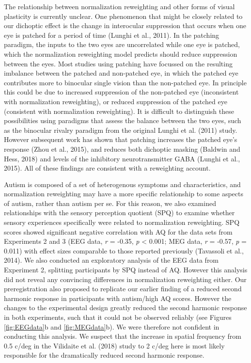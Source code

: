 \documentclass[
]{article}
\begin{document}
The relationship between normalization reweighting and other forms of visual plasticity is currently unclear. One phenomenon that might be closely related to our dichoptic effect is the change in interocular suppression that occurs when one eye is patched for a period of time (Lunghi et al., 2011). In the patching paradigm, the inputs to the two eyes are uncorrelated while one eye is patched, which the normalization reweighting model predicts should reduce suppression between the eyes. Most studies using patching have focussed on the resulting imbalance between the patched and non-patched eye, in which the patched eye contributes more to binocular single vision than the non-patched eye. In principle this could be due to increased suppression of the non-patched eye (inconsistent with normalization reweighting), or reduced suppression of the patched eye (consistent with normalization reweighting). It is difficult to distinguish these possibilities using paradigms that assess the balance between the two eyes, such as the binocular rivalry paradigm from the original Lunghi et al. (2011) study. However subsequent work has shown that patching increases the patched eye's response (Zhou et al., 2015), and reduces both dichoptic masking (Baldwin and Hess, 2018) and levels of the inhibitory neurotransmitter GABA (Lunghi et al., 2015). All of these findings are consistent with a reweighting account.

Autism is composed of a set of heterogenous symptoms and characteristics, and normalization reweighting may have a more specific relationship to some aspects of autism, rather than autism per se. For this reason, we also examined relationships with the sensory perception quotient (SPQ) to examine whether sensory experiences specifically were related to normalization reweighting. SPQ scores showed significant negative correlation with AQ for the data sets from Experiments 2 and 3 (EEG data, \emph{r} = -0.35, \emph{p} \textless{} 0.001; MEG data, \emph{r} = -0.57, \emph{p} = 0.011) with effect sizes comparable to those reported previously (Tavassoli et al., 2014). We also conducted an exploratory analysis of the EEG data from Experiment 2, splitting participants by SPQ instead of AQ. However this analysis did not reveal any convincing differences in normalization reweighting either. Our preregistration also proposed to replicate our earlier finding of a reduced second harmonic response in participants with autism/high AQ scores. However the changes to the experimental design greatly reduced the second harmonic response in both experiments, such that it could not be observed reliably (see Figures \ref{fig:EEGdata}b and \ref{fig:MEGdata}b). We were therefore not confident in conducting this analysis. We suspect that the increase in spatial frequency from 0.5 c/deg in the Vilidaite et al. (2018) study to 2 c/deg here is most likely responsible for the dramatically reduced second harmonic response.
\end{document}
